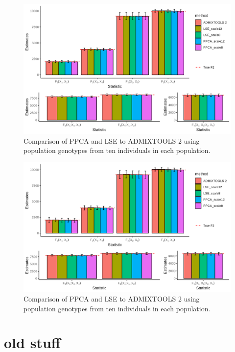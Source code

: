 \documentclass[12pt, letterpaper]{article}
\begin{document}
\begin{figure}[ht!]
    \includegraphics[width=16.5cm]{plots/simfiles/Ne1000/split_times1000/npop10_nind100/plots_8_12/mu0.05_plot_all.png}
    \centering
    \caption{Comparison of PPCA and LSE to ADMIXTOOLS 2 using population genotypes from ten individuals in each population.}
    \label{figS2:pc_scale}
\end{figure}

\begin{figure}[ht!]
    \includegraphics[width=16.5cm]{plots/simfiles/Ne1000/split_times1000/npop10_nind100/plots_8_12/mu0.05_plot_all_1ind.png}
    \centering
    \caption{Comparison of PPCA and LSE to ADMIXTOOLS 2 using population genotypes from ten individuals in each population.}
    \label{figS2:pc_scale}
\end{figure}


\section{old stuff}
\end{document}
